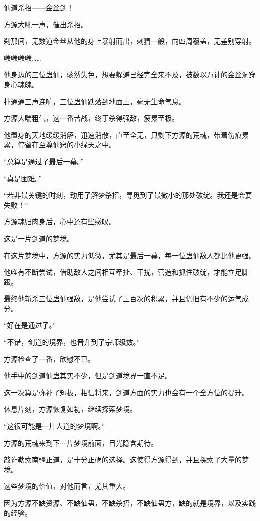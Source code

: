 
\begin{this_body}

仙道杀招——金丝剑！

方源大吼一声，催出杀招。

刹那间，无数道金丝从他的身上暴射而出，刺猬一般，向四周覆盖，无差别穿射。

嗤嗤嗤嗤……

他身边的三位蛊仙，骇然失色，想要躲避已经完全来不及，被数以万计的金丝洞穿身心魂魄。

扑通通三声连响，三位蛊仙跌落到地面上，毫无生命气息。

方源大喘粗气，这一番苦战，终于杀得强敌，疲累至极。

他置身的天地缓缓消解，迅速消散，直至全无，只剩下方源的荒魂，带着伤痕累累，停留在至尊仙窍的小绿天之中。

“总算是通过了最后一幕。”

“真是困难。”

“若非最关键的时刻，动用了解梦杀招，寻觅到了最微小的那处破绽。我还是会要失败！”

方源魂归肉身后，心中还有些感叹。

这是一片剑道的梦境。

在这片梦境中，方源的实力低微，尤其是最后一幕，每一位蛊仙敌人都比他更强。

他唯有不断尝试，借助敌人之间相互牵扯、干扰，营造和抓住破绽，才能立足脚跟。

最终他斩杀三位蛊仙强敌，是他尝试了上百次的积累，并且仍旧有不少的运气成分。

“好在是通过了。”

“不错，剑道的境界，也晋升到了宗师级数。”

方源检查了一番，欣慰不已。

他手中的剑道仙蛊其实不少，但是剑道境界一直不足。

这一次算是弥补了短板，相信将来，剑道方面的实力也会有一个全方位的提升。

休息片刻，方源恢复如初，继续探索梦境。

“这很可能是一片人道的梦境啊。”

方源的荒魂来到下一片梦境前面，目光隐含期待。

敲诈勒索南疆正道，是十分正确的选择。这使得方源得到，并且探索了大量的梦境。

这些梦境的价值，对他而言，尤其重大。

因为方源不缺资源、不缺仙蛊，不缺杀招，不缺仙蛊方，缺的就是境界，以及实践的经验。


\end{this_body}
